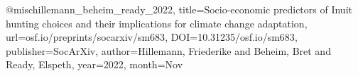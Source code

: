 @misc{hillemann_beheim_ready_2022,
 title={Socio-economic predictors of Inuit hunting choices and their implications for climate change adaptation},
 url={osf.io/preprints/socarxiv/sm683},
 DOI={10.31235/osf.io/sm683},
 publisher={SocArXiv},
 author={Hillemann, Friederike and Beheim, Bret and Ready, Elspeth},
 year={2022},
 month={Nov}
}